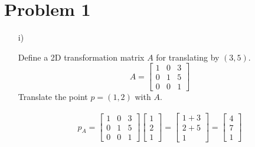 \section*{Problem 1}
\begin{itemize}
    \item[i)] {
    Define a 2D transformation matrix $A$ for translating by $(3,5)$. 
    \begin{equation*}
        A = \begin{bmatrix}
        1 & 0 & 3\\
        0 & 1 & 5\\
        0 & 0 & 1
        \end{bmatrix} 
        \label{eq:a-matrix}
    \end{equation*}
    Translate the point $p=(1,2)$ with $A$.
    
    \begin{eqnarray*}
    p_A = \begin{bmatrix} 
              1 & 0 & 3\\
              0&1&5\\
              0&0&1
            \end{bmatrix}
            \begin{bmatrix}
                1\\2\\1
            \end{bmatrix}
            = \begin{bmatrix}
                    1 + 3 \\
                    2 + 5 \\
                    1
                    \end{bmatrix}
            = \begin{bmatrix}
            4\\7\\1
            \end{bmatrix}
    \end{eqnarray*}

}
\end{itemize}
